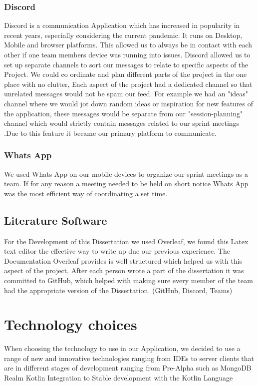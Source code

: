 \subsubsection{Discord} Discord is a communication Application which has increased in popularity in recent years, especially considering the current pandemic. It runs on Desktop, Mobile and browser platforms. This allowed us to always be in contact with each other if one team members device was running into issues.
\newline
Discord allowed us to set up separate channels to sort our messages to relate to specific aspects of the Project. We could co ordinate and plan different parts of the project in the one place with no clutter, Each aspect of the project had a dedicated channel so that unrelated messages would not be spam our feed. For example we had an "ideas" channel where we would jot down random ideas or inspiration for new features of the application, these messages would be separate from our "session-planning" channel which would strictly contain messages related to our sprint meetings .Due to this feature it became our primary platform to communicate.
\newline
\subsubsection{Whats App}
We used Whats App on our mobile devices to organize our sprint meetings as a team. If for any reason a meeting needed to be held on short notice Whats App was the most efficient way of coordinating a set time.
\subsection{Literature Software}
For the Development of this Dissertation we used Overleaf, we found this Latex text editor the effective way to write up due our previous experience. The Documentation Overleaf provides is well structured which helped us with this aspect of the project. After each person wrote a part of the dissertation it was committed to GitHub, which helped with making sure every member of the team had the appropriate version of the Dissertation.
(GitHub, Discord, Teams)
\section{Technology choices}
When choosing the technology to use in our Application, we decided to use a range of new and innovative technologies ranging from IDEs to server clients that are in different stages of development ranging from Pre-Alpha such as MongoDB Realm Kotlin Integration to Stable development with the Kotlin Language
